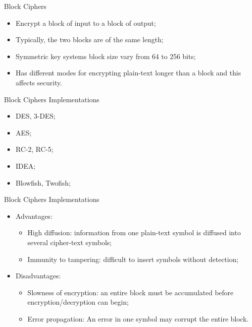 \documentclass[12pt,table,xcolor={dvipsnames}]{beamer}
\begin{document}
\begin{frame}{Block Ciphers}
\begin{itemize}
\item Encrypt a block of input to a block of output;\pause
\item Typically, the two blocks are of the same length;\pause
\item Symmetric key systems block size vary from 64 to 256 bits;\pause
\item Has different modes for encrypting plain-text longer than a block and this affects security.
\end{itemize}
\end{frame}

\begin{frame}{Block Ciphers Implementations}
\begin{itemize}
\item DES, 3-DES;\pause
\item AES;\pause
\item RC-2, RC-5;\pause
\item IDEA;\pause
\item Blowfish, Twofish;\pause
\end{itemize}
\end{frame}

\begin{frame}{Block Ciphers Implementations}
\begin{itemize}
\item Advantages:\pause
\begin{itemize}
\item High diffusion: information from one plain-text symbol is diffused into several cipher-text symbols;\pause
\item Immunity to tampering: difficult to insert symbols without detection;\pause
\end{itemize}
\item Disadvantages:\pause
\begin{itemize}
\item Slowness of encryption: an entire block must be accumulated before encryption/decryption can begin;\pause
\item Error propagation: An error in one symbol may corrupt the entire block.
\end{itemize}
\end{itemize}
\end{frame}
\end{document}
